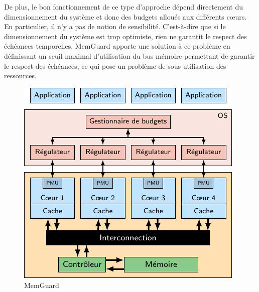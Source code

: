 De plus, le bon fonctionnement de ce type d'approche dépend directement du dimensionnement du système et donc des budgets alloués aux différents cœurs.
En particulier, il n'y a pas de notion de sensibilité.
C'est-à-dire que si le dimensionnement du système est trop optimiste, rien ne garantit le respect des échéances temporelles.
MemGuard apporte une solution à ce problème en définissant un seuil maximal d'utilisation du bus mémoire permettant de garantir le respect des échéances, ce qui pose un problème de sous utilisation des ressources.



\begin{figure}
	\centering
	\includegraphics[width=0.6\linewidth]{graphics/figures/memguard.pdf}
	\caption{\label{fig:memguard}MemGuard}
\end{figure}

